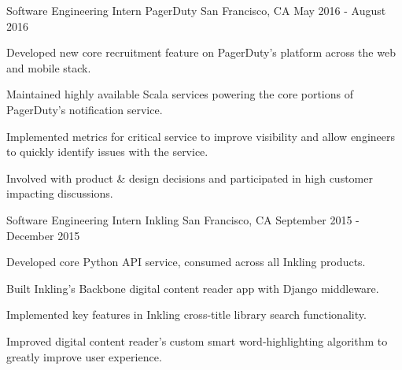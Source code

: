 

\begin{cventries}

  \cventry
    {Software Engineering Intern} %
    {PagerDuty} %
    {San Francisco, CA} %
    {May 2016 - August 2016} %
    {
      \begin{cvitems} %
      \item {Developed new core recruitment feature on PagerDuty's platform across the web and mobile stack.}
      \item {Maintained highly available Scala services powering the core portions of PagerDuty's notification service.}
      \item {Implemented metrics for critical service to improve visibility and allow engineers to quickly identify issues with the service. }
      \item {Involved with product \& design decisions and participated in high customer impacting discussions. }
      \end{cvitems}
    }

  \cventry
    {Software Engineering Intern} %
    {Inkling} %
    {San Francisco, CA} %
    {September 2015 - December 2015} %
    {
      \begin{cvitems} %
      \item {Developed core Python API service, consumed across all Inkling products.}
      \item {Built Inkling's Backbone digital content reader app with Django middleware.}
      \item {Implemented key features in Inkling cross-title library search functionality.}
      \item {Improved digital content reader's custom smart word-highlighting algorithm to greatly improve user experience.}
      \end{cvitems}
    }


\end{cventries}
